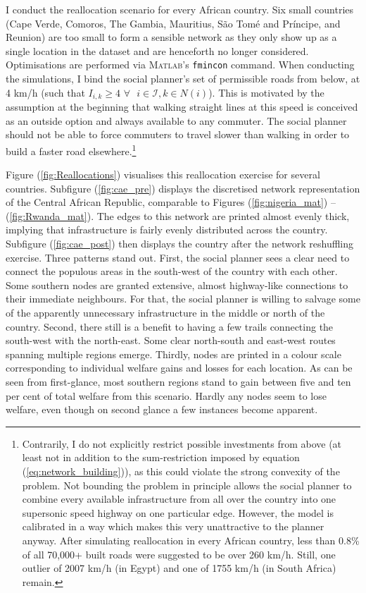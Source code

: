 \documentclass[11pt, oneside]{article}   	%
\let\oldref\ref
\renewcommand{\ref}[1]{(\oldref{#1})}
\begin{document}
I conduct the reallocation scenario for every African country. Six small countries (Cape Verde, Comoros, The Gambia, Mauritius, São Tomé and Príncipe, and Reunion) are too small to form a sensible network as they only show up as a single location in the dataset and are henceforth no longer considered. Optimisations are performed via \textsc{Matlab}'s \texttt{fmincon} command. When conducting the simulations, I bind the social planner's set of permissible roads from below, at 4 km/h (such that $I_{i,k} \geq 4$ $ \forall \textrm{ } i \in \mathcal{I},k \in N(i)$). This is motivated by the assumption at the beginning that walking straight lines at this speed is conceived as an outside option and always available to any commuter. The social planner should not be able to force commuters to travel slower than walking in order to build a faster road elsewhere.\footnote{Contrarily, I do not explicitly restrict possible investments from above (at least not in addition to the sum-restriction imposed by equation \ref{eq:network_building}), as this could violate the strong convexity of the problem. Not bounding the problem in principle allows the social planner to combine every available infrastructure from all over the country into one supersonic speed highway on one particular edge. However, the model is calibrated in a way which makes this very unattractive to the planner anyway. After simulating reallocation in every African country, less than 0.8\% of all 70,000+ built roads were suggested to be over 260 km/h. Still, one outlier of 2007 km/h (in Egypt) and one of 1755 km/h (in South Africa) remain.}

Figure \ref{fig:Reallocations} visualises this reallocation exercise for several countries. Subfigure \ref{fig:cae_pre} displays the discretised network representation of the Central African Republic, comparable to Figures \ref{fig:nigeria_mat} -- \ref{fig:Rwanda_mat}. The edges to this network are printed almost evenly thick, implying that infrastructure is fairly evenly distributed across the country. Subfigure \ref{fig:cae_post} then displays the country after the network reshuffling exercise. Three patterns stand out. First, the social planner sees a clear need to connect the populous areas in the south-west of the country with each other. Some southern nodes are granted extensive, almost highway-like connections to their immediate neighbours. For that, the social planner is willing to salvage some of the apparently unnecessary infrastructure in the middle or north of the country. Second, there still is a benefit to having a few trails connecting the south-west with the north-east. Some clear north-south and east-west routes spanning multiple regions emerge. Thirdly, nodes are printed in a colour scale corresponding to individual welfare gains and losses for each location. As can be seen from first-glance, most southern regions stand to gain between five and ten per cent of total welfare from this scenario. Hardly any nodes seem to lose welfare, even though on second glance a few instances become apparent.
\end{document}
